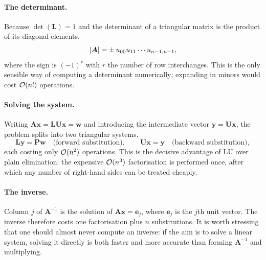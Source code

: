 \paragraph{The determinant.}
Because $\det(\bm{L})=1$ and the determinant of a triangular matrix is the
product of its diagonal elements,
\begin{equation}
  {|\boldsymbol{A}|} = \pm\, u_{00}u_{11}\cdots u_{n-1,n-1},
  \label{eq:1-ludet}
\end{equation}
where the sign is $(-1)^{r}$ with $r$ the number of row interchanges.  This is
the only sensible way of computing a determinant numerically; expanding in
minors would cost $\mathcal{O}(n!)$ operations.

\paragraph{Solving the system.}
Writing $\bm{A}\bm{x}=\bm{L}\bm{U}\bm{x}=\bm{w}$ and introducing the
intermediate vector $\bm{y}=\bm{U}\bm{x}$, the problem splits into two
triangular systems,
\begin{equation}
  \bm{L}\bm{y}=\bm{P}\bm{w}
  \quad\text{(forward substitution)},
  \qquad
  \bm{U}\bm{x}=\bm{y}
  \quad\text{(backward substitution)} ,
  \label{eq:1-lusolve}
\end{equation}
each costing only $\mathcal{O}(n^2)$ operations.  This is the decisive advantage of
LU over plain elimination: the expensive $\mathcal{O}(n^3)$ factorisation is
performed once, after which any number of right-hand sides can be treated
cheaply.

\paragraph{The inverse.}
Column $j$ of $\bm{A}^{-1}$ is the solution of $\bm{A}\bm{x}=\bm{e}_j$, where
$\bm{e}_j$ is the $j$th unit vector.  The inverse therefore costs one
factorisation plus $n$ substitutions.  It is worth stressing that one should
almost never compute an inverse: if the aim is to solve a linear system,
solving it directly is both faster and more accurate than forming
$\bm{A}^{-1}$ and multiplying.

